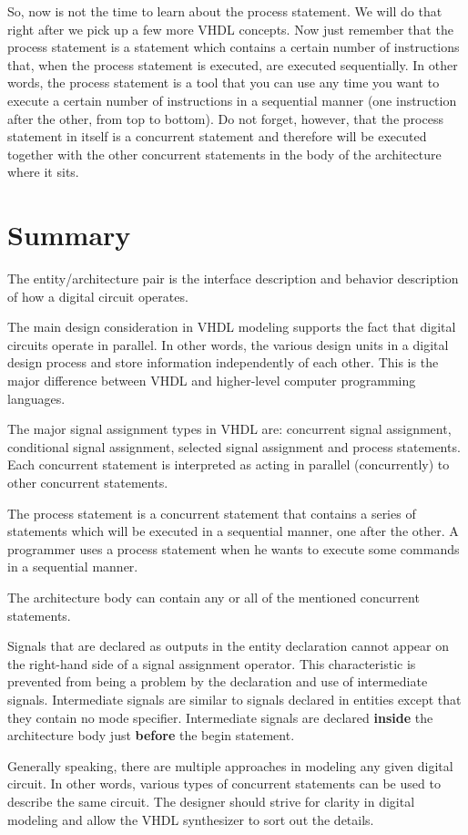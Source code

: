 So, now is not the time to learn about the process statement. We will do that right after we pick up a few more VHDL concepts. Now just remember that the process statement is a statement which contains a certain number of instructions that, when the process statement is executed, are executed sequentially. In other words, the process statement is a tool that you can use any time you want to execute a certain number of instructions in a sequential manner (one instruction after the other, from top to bottom). Do not forget, however, that the process statement in itself is a concurrent statement and therefore will be executed together with the other concurrent statements in the body of the architecture where it sits.

\section{Summary} 
\begin{my_list}
\item The entity/architecture pair is the interface description and behavior description of how a digital circuit operates.
\item The main design consideration in VHDL modeling supports the fact that digital circuits operate in parallel. In other words, the various design units in a digital design process and store information independently of each other. This is the major difference between VHDL and higher-level computer programming languages.
\item The major signal assignment types in VHDL are: concurrent signal assignment, conditional signal assignment, selected signal assignment and process statements. Each concurrent statement is interpreted as acting in parallel (concurrently) to other concurrent statements.
\item The process statement is a concurrent statement that contains a series of statements which will be executed in a sequential manner, one after the other. A programmer uses a process statement when he wants to execute some commands in a sequential manner.
\item The architecture body can contain any or all of the mentioned concurrent statements.
\item Signals that are declared as outputs in the entity declaration cannot appear on the right-hand side of a signal assignment operator. This characteristic is prevented from being a problem by the declaration and use of intermediate signals. Intermediate signals are similar to signals declared in entities except that they contain no mode specifier. Intermediate signals are declared \textbf{inside} the architecture body just \textbf{before} the begin statement.
\item Generally speaking, there are multiple approaches in modeling any given digital circuit. In other words, various types of concurrent statements can be used to describe the same circuit. The designer should strive for clarity in digital modeling and allow the VHDL synthesizer to sort out the details.
\end{my_list}


